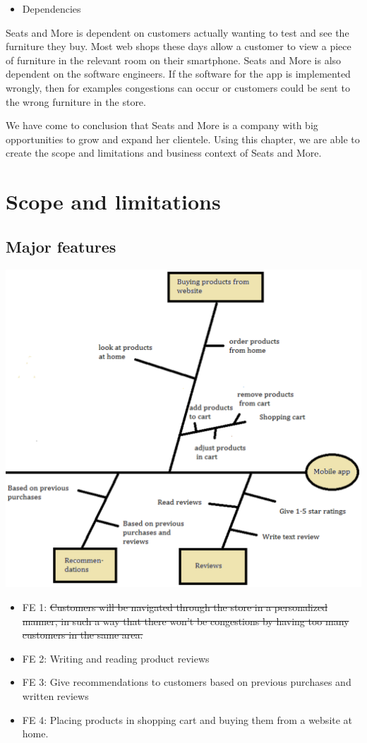\documentclass[a4paper]{article}
\begin{document}
\begin{itemize}
\item Dependencies
\end{itemize}
Seats and More is dependent on customers actually wanting to test and see the furniture they buy. Most web shops these days allow a customer to view a piece of furniture in the relevant room on their smartphone.
Seats and More is also dependent on the software engineers. If the software for the app is implemented wrongly, then for examples congestions can occur or customers could be sent to the wrong furniture in the store.

We have come to conclusion that Seats and More is a company with big opportunities to grow and expand her clientele. Using this chapter, we are able to create the scope and limitations and business context of Seats and More.


\section{Scope and limitations}
\subsection*{Major features}
\includegraphics[scale=0.7]{new_feature_tree.eps}
\begin{itemize}
\item FE 1: \sout{Customers will be navigated through the store in a personalized manner, in such a way that there won't be congestions by having too many customers in the same area.}
\item FE 2: Writing and reading product reviews
\item FE 3: Give recommendations to customers based on previous purchases and written reviews
\item FE 4: Placing products in shopping cart and buying them from a website at home.
\end{itemize}
\end{document}
